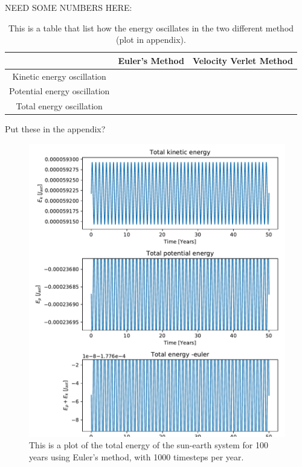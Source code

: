 NEED SOME NUMBERS HERE:

\begin{table}[H]\caption{This is a table that list how the energy oscillates in the two different method (plot in appendix).}\label{tab:energy_oscillations}
\begin{tabular}{ccc}
 & Euler's Method & Velocity Verlet Method\\ \hline
Kinetic energy oscillation & & \\
Potential energy oscillation & & \\
Total energy oscillation & & \\
\end{tabular}
\end{table}

Put these in the appendix?

\begin{figure}[H]
\includegraphics[width=1.1\linewidth]{../results/plots/totalenergy-euler.pdf}\caption{This is a plot of the total energy of the sun-earth system for 100 years using Euler's method, with 1000 timesteps per year.}\label{fig:totalenergy-euler}
\end{figure}	


